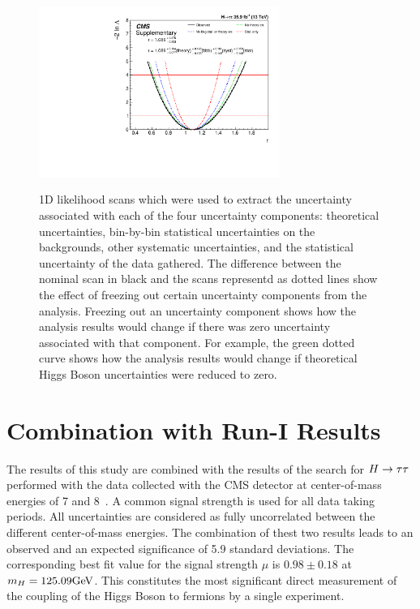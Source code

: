 \begin{figure}[htbp]
\centering
     \includegraphics[width=0.70\textwidth]{higgs_to_taus/plots/cms_output_freeze_All_Theory_bbb}\\
     \caption{
1D likelihood scans which were used to extract the uncertainty associated with each of the four uncertainty
components: theoretical uncertainties, bin-by-bin statistical uncertainties on the backgrounds, other 
systematic uncertainties, and the statistical uncertainty of the data gathered. The difference between
the nominal scan in black and the scans representd as dotted lines show the effect of freezing out certain
uncertainty components from the analysis. Freezing out an uncertainty component shows how the analysis
results would change if there was zero uncertainty associated with that component. For example, the green
dotted curve shows how the analysis results would change if theoretical Higgs Boson uncertainties were
reduced to zero.
}
     \label{fig:htt_systematic_parabola}
\end{figure}


\section{Combination with Run-I Results}
The results of this study are combined with the results of the search for $H\to\tau\tau$ performed with the data collected with 
the CMS detector at center-of-mass energies of 7 and 8\TeV~\cite{Khachatryan:2014jba}. A common signal strength is used
for all data taking periods. All uncertainties are considered as fully uncorrelated between the different 
center-of-mass energies. The combination of thest two results leads to an observed and an expected significance of 5.9 standard 
deviations. The corresponding best fit value for the signal strength $\mu$ is $0.98\pm 0.18$ at 
$m_{H} = 125.09\mathrm{GeV}$. This constitutes the most significant direct measurement of the coupling of the Higgs Boson 
to fermions by a single experiment.

